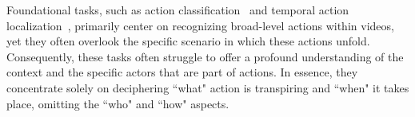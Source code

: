 \documentclass[letterpaper]{article}
\begin{document}
Foundational tasks, such as action classification~\cite{kong2022human} and temporal action localization~\cite{9062498}, primarily center on recognizing broad-level actions within videos, yet they often overlook the specific scenario in which these actions unfold. Consequently, these tasks often struggle to offer a profound understanding of the context and the specific actors that are part of actions. In essence, they concentrate solely on deciphering ``what" action is transpiring and ``when" it takes place, omitting the ``who" and ``how" aspects.
\end{document}

